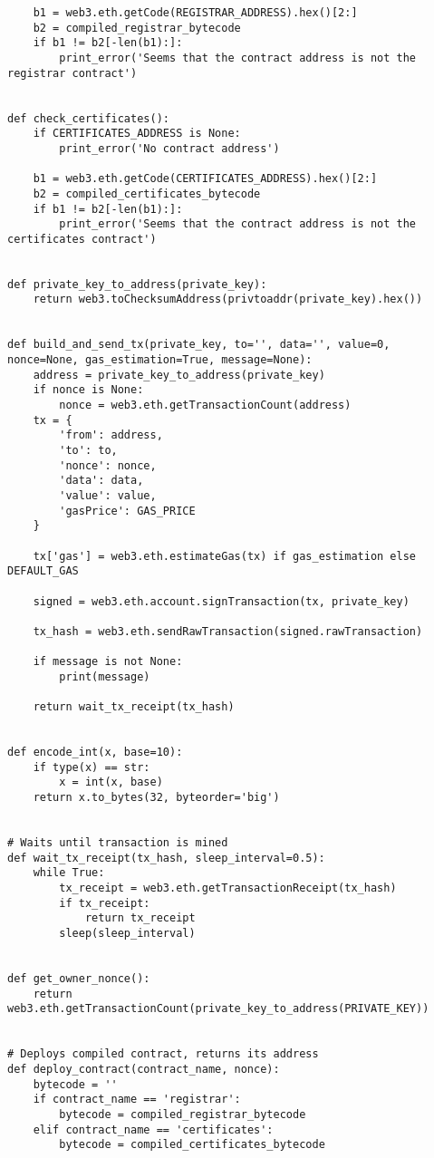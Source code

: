 \begin{verbatim}
    b1 = web3.eth.getCode(REGISTRAR_ADDRESS).hex()[2:]
    b2 = compiled_registrar_bytecode
    if b1 != b2[-len(b1):]:
        print_error('Seems that the contract address is not the registrar contract')


def check_certificates():
    if CERTIFICATES_ADDRESS is None:
        print_error('No contract address')

    b1 = web3.eth.getCode(CERTIFICATES_ADDRESS).hex()[2:]
    b2 = compiled_certificates_bytecode
    if b1 != b2[-len(b1):]:
        print_error('Seems that the contract address is not the certificates contract')


def private_key_to_address(private_key):
    return web3.toChecksumAddress(privtoaddr(private_key).hex())


def build_and_send_tx(private_key, to='', data='', value=0, nonce=None, gas_estimation=True, message=None):
    address = private_key_to_address(private_key)
    if nonce is None:
        nonce = web3.eth.getTransactionCount(address)
    tx = {
        'from': address,
        'to': to,
        'nonce': nonce,
        'data': data,
        'value': value,
        'gasPrice': GAS_PRICE
    }

    tx['gas'] = web3.eth.estimateGas(tx) if gas_estimation else DEFAULT_GAS

    signed = web3.eth.account.signTransaction(tx, private_key)

    tx_hash = web3.eth.sendRawTransaction(signed.rawTransaction)

    if message is not None:
        print(message)

    return wait_tx_receipt(tx_hash)


def encode_int(x, base=10):
    if type(x) == str:
        x = int(x, base)
    return x.to_bytes(32, byteorder='big')


# Waits until transaction is mined
def wait_tx_receipt(tx_hash, sleep_interval=0.5):
    while True:
        tx_receipt = web3.eth.getTransactionReceipt(tx_hash)
        if tx_receipt:
            return tx_receipt
        sleep(sleep_interval)


def get_owner_nonce():
    return web3.eth.getTransactionCount(private_key_to_address(PRIVATE_KEY))


# Deploys compiled contract, returns its address
def deploy_contract(contract_name, nonce):
    bytecode = ''
    if contract_name == 'registrar':
        bytecode = compiled_registrar_bytecode
    elif contract_name == 'certificates':
        bytecode = compiled_certificates_bytecode


\end{verbatim}
